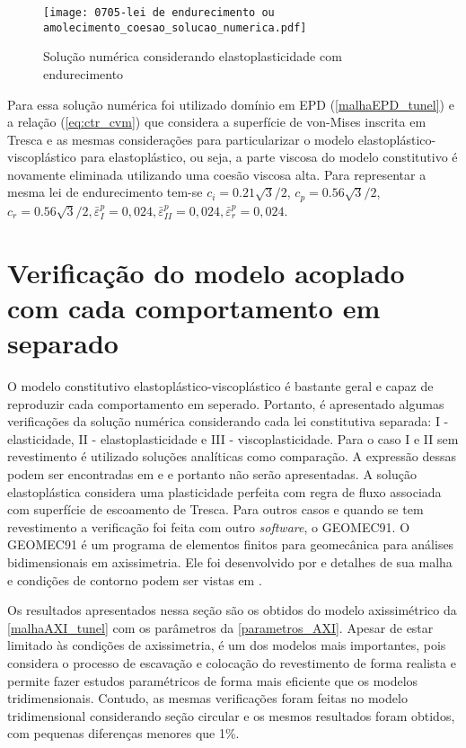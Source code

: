 \begin{figure}[H]
	\begin{center}
		\texttt{[image: 0705-lei de endurecimento ou amolecimento\_coesao\_solucao\_numerica.pdf]}
	\end{center}
	\caption{\label{solucao_numérica_LAJSS}Solução numérica considerando elastoplasticidade com endurecimento}
\end{figure}
Para essa solução numérica foi utilizado domínio em EPD (\autoref{malhaEPD_tunel}) e a relação (\ref{eq:ctr_cvm}) que considera a superfície de von-Mises inscrita em Tresca e as mesmas considerações para particularizar o modelo elastoplástico-viscoplástico para elastoplástico, ou seja, a parte viscosa do modelo constitutivo é novamente eliminada utilizando uma coesão viscosa alta. Para representar a mesma lei de endurecimento tem-se $c_i = 0.21\sqrt{3}/2$, $c_p = 0.56\sqrt{3}/2$, $c_r = 0.56\sqrt{3}/2, \bar \varepsilon^p_{I} = 0,024, \bar \varepsilon^p_{II} = 0,024, \bar \varepsilon^p_{r} = 0,024$. 

\section{Verificação do modelo acoplado com cada comportamento em separado}
O modelo constitutivo elastoplástico-viscoplástico é bastante geral e capaz de reproduzir cada comportamento em seperado. Portanto, é apresentado algumas verificações da solução numérica considerando cada lei constitutiva separada: I - elasticidade, II - elastoplasticidade e III - viscoplasticidade. Para o caso I e II sem revestimento é utilizado soluções analíticas como comparação. A expressão dessas podem ser encontradas em  e  e portanto não serão apresentadas. A solução elastoplástica considera uma plasticidade perfeita com regra de fluxo associada com superfície de escoamento de Tresca. Para outros casos e quando se tem revestimento a verificação foi feita com outro \textit{software}, o GEOMEC91. O GEOMEC91 é um programa de elementos finitos para geomecânica para análises bidimensionais em axissimetria. Ele foi desenvolvido por  e detalhes de sua malha e condições de contorno podem ser vistas em .

Os resultados apresentados nessa seção são os obtidos do modelo axissimétrico da \autoref{malhaAXI_tunel} com os parâmetros da \autoref{parametros_AXI}. Apesar de estar limitado às condições de axissimetria, é um dos modelos mais importantes, pois considera o processo de escavação e colocação do revestimento de forma realista e permite fazer estudos paramétricos de forma mais eficiente que os modelos tridimensionais. Contudo, as mesmas verificações foram feitas no modelo tridimensional considerando seção circular e os mesmos resultados foram obtidos, com pequenas diferenças menores que 1\%.


